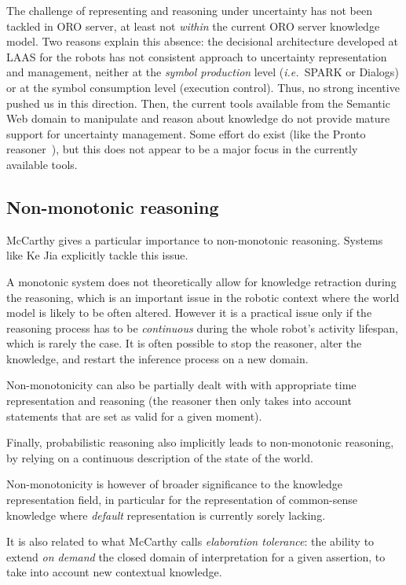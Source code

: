 \documentclass{IEEEtran}
\newcommand{\ie}{{\textit{i.e.\ }}}
\begin{document}
The challenge of representing and reasoning under uncertainty has not been
tackled in ORO server, at least not \emph{within} the current ORO server
knowledge model. Two reasons explain this absence: the decisional architecture
developed at LAAS for the robots has not consistent approach to uncertainty
representation and management, neither at the \emph{symbol production} level
(\ie SPARK or {\sc Dialogs}) or at the symbol consumption level (execution
control). Thus, no strong incentive pushed us in this direction. Then, the
current tools available from the Semantic Web domain to manipulate and reason
about knowledge do not provide mature support for uncertainty management. Some
effort do exist (like the {\sc Pronto} reasoner~\cite{Klinov2008}), but this
does not appear to be a major focus in the currently available tools.

\subsection{Non-monotonic reasoning}

McCarthy gives a particular importance to non-monotonic reasoning. Systems like
Ke Jia explicitly tackle this issue.

A monotonic system does not theoretically allow for knowledge retraction during
the reasoning, which is an important issue in the robotic context where the
world model is likely to be often altered.  However it is a practical issue
only if the reasoning process has to be \emph{continuous} during the whole
robot's activity lifespan, which is rarely the case. It is often possible to
stop the reasoner, alter the knowledge, and restart the inference process on a
new domain.

Non-monotonicity can also be partially dealt with with appropriate time
representation and reasoning (the reasoner then only takes into account
statements that are set as valid for a given moment).

Finally, probabilistic reasoning also implicitly leads to non-monotonic
reasoning, by relying on a continuous description of the state of the
world.

Non-monotonicity is however of broader significance to the knowledge
representation field, in particular for the representation of common-sense
knowledge where \emph{default} representation is currently sorely lacking.

It is also related to what McCarthy calls \emph{elaboration tolerance}: the
ability to extend \emph{on demand} the closed domain of interpretation for a
given assertion, to take into account new contextual knowledge.
\end{document}
